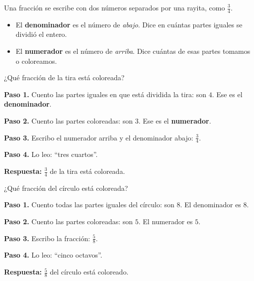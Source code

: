 \begin{wbidea}
Una fracción se escribe con dos números separados por una rayita, como $\frac{3}{4}$.

\begin{itemize}
\item El \textbf{denominador} es el número de \emph{abajo}. Dice en cuántas partes iguales se dividió el entero.
\item El \textbf{numerador} es el número de \emph{arriba}. Dice cuántas de esas partes tomamos o coloreamos.
\end{itemize}

\begin{center}
\end{center}
\end{wbidea}

\begin{wbexample}
¿Qué fracción de la tira está coloreada?

\begin{center}
\end{center}

\textbf{Paso 1.} Cuento las partes iguales en que está dividida la tira: son $4$. Ese es el \textbf{denominador}.

\textbf{Paso 2.} Cuento las partes coloreadas: son $3$. Ese es el \textbf{numerador}.

\textbf{Paso 3.} Escribo el numerador arriba y el denominador abajo: $\frac{3}{4}$.

\textbf{Paso 4.} Lo leo: ``tres cuartos''.

\textbf{Respuesta:} $\frac{3}{4}$ de la tira está coloreada.
\end{wbexample}

\begin{wbexample}
¿Qué fracción del círculo está coloreada?

\begin{center}
\end{center}

\textbf{Paso 1.} Cuento todas las partes iguales del círculo: son $8$. El denominador es $8$.

\textbf{Paso 2.} Cuento las partes coloreadas: son $5$. El numerador es $5$.

\textbf{Paso 3.} Escribo la fracción: $\frac{5}{8}$.

\textbf{Paso 4.} Lo leo: ``cinco octavos''.

\textbf{Respuesta:} $\frac{5}{8}$ del círculo está coloreado.
\end{wbexample}


